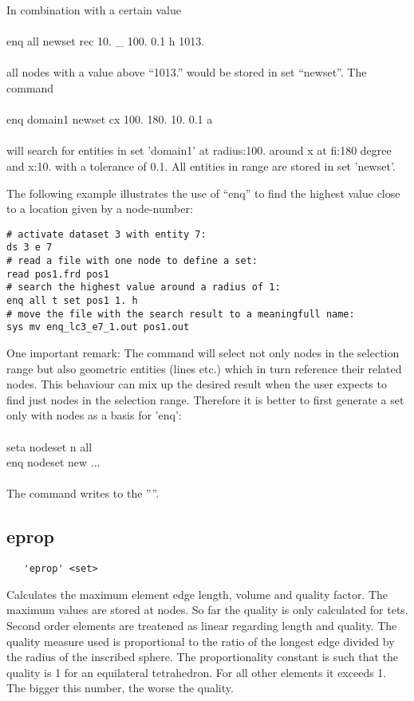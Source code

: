 \documentclass{article}
\begin{document}
In combination with a certain value\\\\
enq all newset rec 10. \_ 100. 0.1 h 1013.\\\\all nodes with a value above ``1013.'' would be stored in set ``newset''. The command \\\\
enq domain1 newset cx 100. 180. 10. 0.1 a\\\\
will search for entities in set 'domain1' at radius:100. around x at fi:180 degree and x:10. with a tolerance of 0.1. All entities in range are stored in set 'newset'.

The following example illustrates the use of ``enq'' to find the highest value close to a location given by a node-number: 
\begin{verbatim}
# activate dataset 3 with entity 7:
ds 3 e 7
# read a file with one node to define a set:
read pos1.frd pos1
# search the highest value around a radius of 1:
enq all t set pos1 1. h
# move the file with the search result to a meaningfull name:
sys mv enq_lc3_e7_1.out pos1.out
\end{verbatim}

One important remark:
The command will select not only nodes in the selection range but also geometric entities (lines etc.) which in turn reference their related nodes. This behaviour can mix up the desired result when the user expects to find just nodes in the selection range. Therefore it is better to first generate a set only with nodes as a basis for 'enq':\\\\
seta nodeset n all\\
enq nodeset new ...\\\\
The command writes to the ''''.


\subsection{\label{eprop}eprop}
\begin{verbatim}
   'eprop' <set>
\end{verbatim}
Calculates the maximum element edge length, volume and quality factor. The maximum values are stored at nodes. So far the quality is only calculated for tets. Second order elements are treatened as linear regarding length and quality. The quality measure used is proportional to the ratio of the longest edge divided by the radius of the inscribed sphere. The proportionality constant is such that the quality is 1 for an equilateral tetrahedron. For all other elements it exceeds 1. The bigger this number, the worse the quality.
\end{document}
